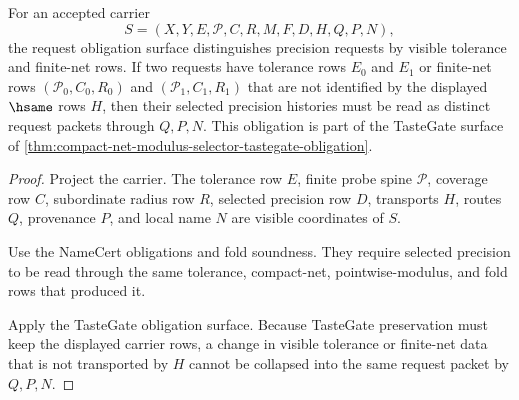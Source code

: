 \begin{theorem}
\label{thm:compact-net-modulus-selector-request-obligation-surface}
For an accepted carrier
$$
S=(X,Y,E,\mathcal{P},C,R,M,F,D,H,Q,P,N),
$$
the request obligation surface distinguishes precision requests by visible tolerance and finite-net rows. If two requests have tolerance rows $E_0$ and $E_1$ or finite-net rows $(\mathcal{P}_0,C_0,R_0)$ and $(\mathcal{P}_1,C_1,R_1)$ that are not identified by the displayed $\hsame$ rows $H$, then their selected precision histories must be read as distinct request packets through $Q,P,N$. This obligation is part of the TasteGate surface of \autoref{thm:compact-net-modulus-selector-tastegate-obligation}.
\end{theorem}
\begin{proof}
Project the carrier. The tolerance row $E$, finite probe spine $\mathcal{P}$, coverage row $C$, subordinate radius row $R$, selected precision row $D$, transports $H$, routes $Q$, provenance $P$, and local name $N$ are visible coordinates of $S$.

Use the NameCert obligations and fold soundness. They require selected precision to be read through the same tolerance, compact-net, pointwise-modulus, and fold rows that produced it.

Apply the TasteGate obligation surface. Because TasteGate preservation must keep the displayed carrier rows, a change in visible tolerance or finite-net data that is not transported by $H$ cannot be collapsed into the same request packet by $Q,P,N$.
\end{proof}

